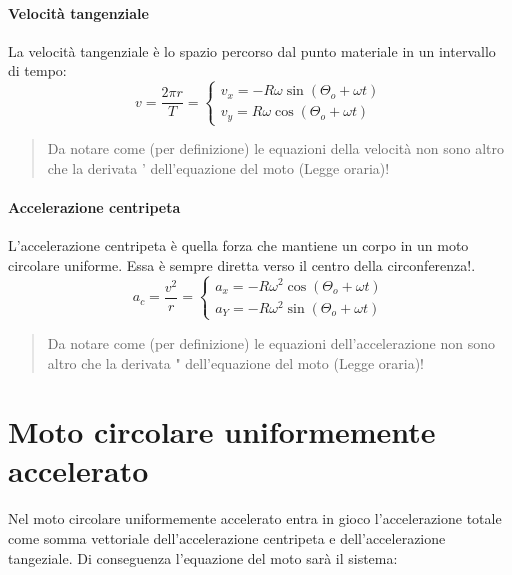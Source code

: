         \paragraph{Velocità tangenziale} La velocità tangenziale è lo spazio 
        percorso dal punto materiale in un intervallo di tempo:
        \begin{equation}
            v = \frac{2\pi r}{T} = 
            \begin{cases}
                v_x=-R\omega\sin{(\Theta_o+\omega t)} \\
                v_y=R\omega\cos{(\Theta_o+\omega t)}
            \end{cases}
        \end{equation}

        \begin{quote}
            Da notare come (per definizione) le equazioni della velocità non 
            sono altro che la derivata ' dell'equazione del moto 
            (Legge oraria)! 
        \end{quote}

        \paragraph{Accelerazione centripeta} L'accelerazione centripeta è 
        quella forza che mantiene un corpo in un moto circolare uniforme. Essa
        è sempre diretta verso il centro della circonferenza!.
        \begin{equation}
            a_c = \frac{v^2}{r}=
            \begin{cases}
                a_x=-R\omega^2\cos{(\Theta_o+\omega t)} \\
                a_Y=-R\omega^2\sin{(\Theta_o+\omega t)}\end{cases}
        \end{equation}

        \begin{quote}
            Da notare come (per definizione) le equazioni dell'accelerazione 
            non sono altro che la derivata " dell'equazione del moto 
            (Legge oraria)! 
        \end{quote}
        
    \section{Moto circolare uniformemente accelerato} Nel moto circolare 
    uniformemente accelerato entra in gioco l'accelerazione totale come somma
    vettoriale dell'accelerazione centripeta e dell'accelerazione tangeziale.
    Di conseguenza l'equazione del moto sarà il sistema:

